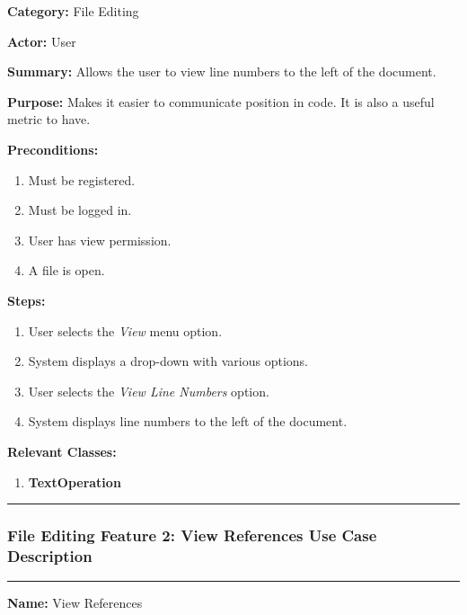 \documentclass[twoside,letterpaper]{article}
\begin{document}
		\noindent\textbf{Category:} File Editing \newline
		
		\noindent\textbf{Actor:} User \newline
		
		\noindent\textbf{Summary:} Allows the user to view line numbers to the left of the document. \newline
		
		\noindent\textbf{Purpose:} Makes it easier to communicate position in code. It is also a useful metric to have.\newline
		
		\noindent\textbf{Preconditions:}
		\begin{enumerate}
			\item Must be registered.
			\item Must be logged in.
			\item User has view permission.
			\item A file is open.
		\end{enumerate}
		\noindent\textbf{Steps:}
		\begin{enumerate}
			\item User selects the \textit{View} menu option.
			\item System displays a drop-down with various options.
			\item User selects the \textit{View Line Numbers} option.
			\item System displays line numbers to the left of the document.
		\end{enumerate}
		\noindent\textbf{Relevant Classes:}
		\begin{enumerate}
			\item \textbf {TextOperation}
	
		\end{enumerate}
	\vspace{8pt}
	\hrule
	\newpage
	
	
	\subsubsection[File Editing Feature 2: View References]{\rmfamily\bfseries\color{black}
		File Editing Feature 2: View References Use Case Description}
	\hypertarget{RefHeading22059017292}{}
	
	\vspace{2pt}
	\hrule
	\vspace{8pt}
		\noindent\textbf{Name:} View References \newline
		
\end{document}
